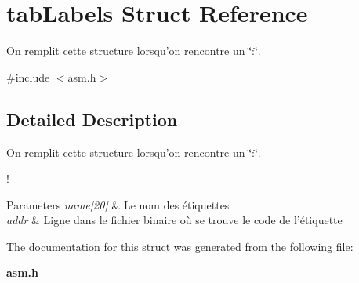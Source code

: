 \section{tab\-Labels Struct Reference}
\label{structtab_labels}


On remplit cette structure lorsqu'on rencontre un \char`\"{}\-:\char`\"{}.  




{\ttfamily \#include $<$asm.\-h$>$}



\subsection{Detailed Description}
On remplit cette structure lorsqu'on rencontre un \char`\"{}\-:\char`\"{}. 

! 
\begin{DoxyParams}{Parameters}
{\em name\mbox{[}20\mbox{]}} & Le nom des étiquettes \\
\hline
{\em addr} & Ligne dans le fichier binaire où se trouve le code de l'étiquette \\
\hline
\end{DoxyParams}


The documentation for this struct was generated from the following file\-:\begin{DoxyCompactItemize}
\item 
{\bf asm.\-h}\end{DoxyCompactItemize}
